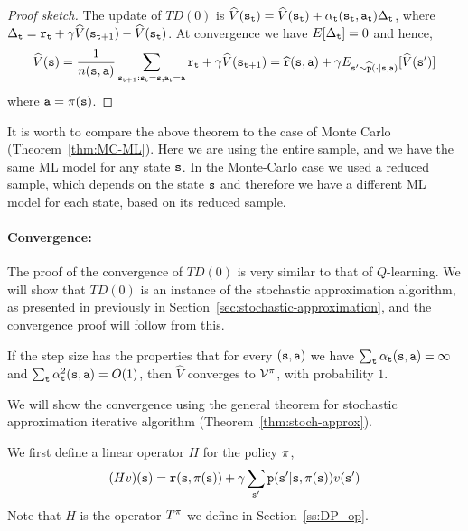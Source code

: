 \begin{proof}[Proof sketch]
The update of $TD(0)$ is
$\widehat{V}({\tt s}_{\tt t})=\widehat{V}({\tt s}_{\tt t})+\alpha_{\tt t}({\tt s}_{\tt t},{\tt a}_{\tt t})\Delta_{\tt t}$,
where $\Delta_{\tt t}={\tt r}_{\tt t}+\gamma
\widehat{V}({\tt s}_{{\tt t}+1})-\widehat{V}({\tt s}_{\tt t})$. At
convergence we have $E[\Delta_{\tt t}]=0$ and hence,
\[
\widehat{V}({\tt s})=\frac{1}{n({\tt s},{\tt a})}\sum_{{\tt s}_{{\tt t}+1}:{\tt s}_{\tt t}={\tt s},{\tt a}_{\tt t}={\tt a}}
{\tt r}_{\tt t}+\gamma
\widehat{V}({\tt s}_{{\tt t}+1})=\widehat{{\tt r}}({\tt s},{\tt a})+\gamma
E_{{\tt s}'\sim
\widehat{{\tt p}}(\cdot|{\tt s},{\tt a})}[\widehat{V}({\tt s}')]
\]
where ${\tt a}=\pi({\tt s})$.
\end{proof}

It is worth to compare the above theorem to the case of Monte Carlo
(Theorem~\ref{thm:MC-ML}). Here we are using the entire sample, and
we have the same ML model for any state ${\tt s}$. In the Monte-Carlo
case we used a reduced sample, which depends on the state ${\tt s}$
and therefore we have a different ML model for each state, based on
its reduced sample.

\paragraph{Convergence:} The proof of the convergence of $TD(0)$ is very
similar to that of $Q$-learning. We will show that $TD(0)$ is an
instance of the stochastic approximation algorithm, as presented in
previously in Section~\ref{sec:stochastic-approximation}, and the
convergence proof will follow from this.

\begin{theorem}[Convergence $TD(0)$]
\label{thm:TD0-conrg} If the step size has the properties that for
every $({\tt s},{\tt a})$ we have $\sum_{\tt t}
\alpha_{\tt t}({\tt s},{\tt a})=\infty $ and $\sum_{\tt t}
\alpha_{\tt t}^2({\tt s},{\tt a})=O(1)$, then $\widehat{V}$ converges
to $\mathcal{V}^\pi$, with probability $1$.
\end{theorem}

We will show the convergence using the general theorem for
stochastic approximation iterative algorithm
(Theorem~\ref{thm:stoch-approx}).

We first define a linear operator $H$ for the policy $\pi$,
\[
(Hv)({\tt s})={\tt r}({\tt s},\pi({\tt s}))+\gamma\sum_{{\tt s}'}{\tt p}({\tt s}'|{\tt s},\pi({\tt s}))v({\tt s}')
\]
Note that $H$ is the operator $T^\pi$ we define in
Section~\ref{ss:DP_op}.

